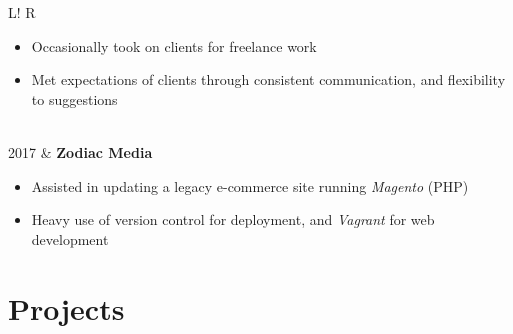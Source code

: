 \documentclass[10pt, a4paper]{article}
\newcommand\vsep{\color{lightgray} \vrule width 0.5pt}
\newcommand\sect[1]{\section*{\hspace{.05cm} \Large\sc #1}}
\newcommand\itemizespace{\vspace{-0.65\baselineskip}}
\begin{document}
\begin{tabular}{L!{\vsep}R}
\begin{itemize}[label=\raisebox{0.25ex}{\tiny$\bullet$}]
                        \item Occasionally took on clients for freelance work
                        \item Met expectations of clients through consistent communication, and flexibility to suggestions
                        \itemizespace
                    \end{itemize} \\
                2017 & \textbf{Zodiac Media}
                    \begin{itemize}[label=\raisebox{0.25ex}{\tiny$\bullet$}]
                        \setlength{\itemindent}{-0.125in}
                        \item Assisted in updating a legacy e-commerce site running \textit{Magento} (PHP)
                        \item Heavy use of version control for deployment, and \textit{Vagrant} for web development
                        \vspace{-1.1\baselineskip}
                    \end{itemize}
            \end{tabular}
        \sect{Projects}
\end{document}
